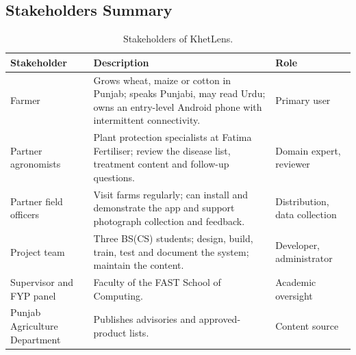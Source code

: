 \subsection{Stakeholders Summary}
\begin{table}[H]
\centering\small
\caption{Stakeholders of KhetLens.}
\label{tab:stakeholders}
\begin{tabularx}{\textwidth}{|L{3.2cm}|Y|L{3.2cm}|}
\hline
\textbf{Stakeholder} & \textbf{Description} & \textbf{Role} \\ \hline
Farmer & Grows wheat, maize or cotton in Punjab; speaks Punjabi, may read Urdu; owns an entry-level Android phone with intermittent connectivity. & Primary user \\ \hline
Partner agronomists & Plant protection specialists at Fatima Fertiliser; review the disease list, treatment content and follow-up questions. & Domain expert, reviewer \\ \hline
Partner field officers & Visit farms regularly; can install and demonstrate the app and support photograph collection and feedback. & Distribution, data collection \\ \hline
Project team & Three BS(CS) students; design, build, train, test and document the system; maintain the content. & Developer, administrator \\ \hline
Supervisor and FYP panel & Faculty of the FAST School of Computing. & Academic oversight \\ \hline
Punjab Agriculture Department & Publishes advisories and approved-product lists. & Content source \\ \hline
\end{tabularx}
\end{table}

